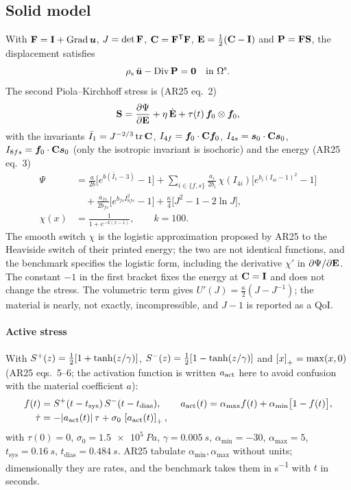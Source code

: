 \subsection{Solid model}\label{sec:solid}
With $\mathbf{F}=\mathbf{I}+\operatorname{Grad}\bm{u}$, $J=\det\mathbf{F}$, $\mathbf{C}=\mathbf{F}^{\mathsf T}\mathbf{F}$,
$\mathbf{E}=\tfrac12(\mathbf{C}-\mathbf{I})$ and $\mathbf{P}=\mathbf{F}\mathbf{S}$, the displacement satisfies
\begin{equation}
\rho_{\mathrm{s}}\,\ddot{\bm{u}} - \operatorname{Div}\mathbf{P} = \bm{0} \quad\text{in } \Omega^{\mathrm{s}}.
\end{equation}
The second Piola--Kirchhoff stress is (AR25 eq.~2)
\begin{equation}
\mathbf{S} = \frac{\partial\Psi}{\partial\mathbf{E}} + \eta\,\dot{\mathbf{E}} + \tau(t)\,\bm{f}_0\otimes\bm{f}_0,
\label{eq:S}
\end{equation}
with the invariants
$\bar I_1 = J^{-2/3}\operatorname{tr}\mathbf{C}$,
$I_{4f} = \bm{f}_0\cdot\mathbf{C}\bm{f}_0$, $I_{4s} = \bm{s}_0\cdot\mathbf{C}\bm{s}_0$, $I_{8fs} = \bm{f}_0\cdot\mathbf{C}\bm{s}_0$
(only the isotropic invariant is isochoric) and the energy (AR25 eq.~3)
\begin{align}
\Psi &= \frac{a}{2b}\bigl[e^{b(\bar I_1-3)}-1\bigr]
 + \sum_{i\in\{f,s\}}\frac{a_i}{2b_i}\,\chi(I_{4i})\bigl[e^{b_i(I_{4i}-1)^2}-1\bigr]
 \nonumber\\
 &\quad + \frac{a_{fs}}{2b_{fs}}\bigl[e^{b_{fs}I_{8fs}^2}-1\bigr]
 + \frac{\kappa}{4}\bigl[J^2-1-2\ln J\bigr],
\label{eq:Psi}\\
\chi(x) &= \frac{1}{1+e^{-k(x-1)}},\qquad k = 100.
\end{align}
The smooth switch $\chi$ is the logistic approximation proposed by AR25 to
the Heaviside switch of their printed energy; the two are not identical
functions, and the benchmark specifies the logistic form, including the
derivative $\chi'$ in $\partial\Psi/\partial\mathbf{E}$. The constant $-1$ in the
first bracket fixes the energy at $\mathbf{C}=\mathbf{I}$ and does not change the stress.
The volumetric term gives $U'(J) = \tfrac{\kappa}{2}(J-J^{-1})$; the
material is nearly, not exactly, incompressible, and $J-1$ is reported as a
QoI.

\paragraph{Active stress} With $S^{+}(z) = \tfrac12[1+\tanh(z/\gamma)]$,
$S^{-}(z) = \tfrac12[1-\tanh(z/\gamma)]$ and $\left[x\right]_{+}=\max(x,0)$
(AR25 eqs.~5--6; the activation function is written $a_{\mathrm{act}}$ here to avoid
confusion with the material coefficient $a$):
\begin{equation}
\begin{aligned}
f(t) &= S^{+}(t-t_{\mathrm{sys}})\,S^{-}(t-t_{\mathrm{dias}}),\qquad
a_{\mathrm{act}}(t) = \alpha_{\max} f(t) + \alpha_{\min}\bigl[1-f(t)\bigr],\\
\dot\tau &= -|a_{\mathrm{act}}(t)|\,\tau + \sigma_0\,\left[a_{\mathrm{act}}(t)\right]_{+},
\end{aligned}
\label{eq:tau}
\end{equation}
with $\tau(0)=0$, $\sigma_0=\SI{1.5e5}{Pa}$, $\gamma=\SI{0.005}{s}$,
$\alpha_{\min}=-30$, $\alpha_{\max}=5$, $t_{\mathrm{sys}}=\SI{0.16}{s}$,
$t_{\mathrm{dias}}=\SI{0.484}{s}$. AR25 tabulate $\alpha_{\min},\alpha_{\max}$
without units; dimensionally they are rates, and the benchmark takes them in
\si{s^{-1}} with $t$ in seconds.

